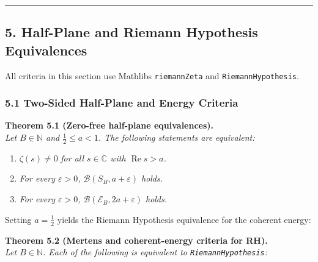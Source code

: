 \documentclass[11pt]{article}
\providecommand{\tightlist}{\setlength{\itemsep}{0pt}\setlength{\parskip}{0pt}}
\begin{document}
\begin{center}\rule{0.5\linewidth}{0.5pt}\end{center}

\subsection{5. Half-Plane and Riemann Hypothesis Equivalences}\label{5-half-plane-and-riemann-hypothesis-equivalences}

All criteria in this section use Mathlib\textquotesingle s \texttt{riemannZeta} and \texttt{RiemannHypothesis}.

\subsubsection{5.1 Two-Sided Half-Plane and Energy Criteria}\label{51-two-sided-half-plane-and-energy-criteria}

\textbf{Theorem 5.1 (Zero-free half-plane equivalences).}\\
\emph{Let \(B \in \mathbb{N}\) and \(\tfrac{1}{2} \le a < 1\). The following statements are equivalent:}

\begin{enumerate}
\def\labelenumi{\arabic{enumi}.}
\tightlist
\item
  \(\zeta(s) \neq 0\) \emph{for all \(s \in \mathbb{C}\) with \(\operatorname{Re} s > a\).}
\item
  \emph{For every \(\varepsilon > 0\), \(\mathcal{B}(S_B, a + \varepsilon)\) holds.}
\item
  \emph{For every \(\varepsilon > 0\), \(\mathcal{B}(\mathscr{E}_B, 2a + \varepsilon)\) holds.}
\end{enumerate}

Setting \(a = \tfrac{1}{2}\) yields the Riemann Hypothesis equivalence for the coherent energy:

\textbf{Theorem 5.2 (Mertens and coherent-energy criteria for RH).}\\
\emph{Let \(B \in \mathbb{N}\). Each of the following is equivalent to \texttt{RiemannHypothesis}:}
\end{document}
